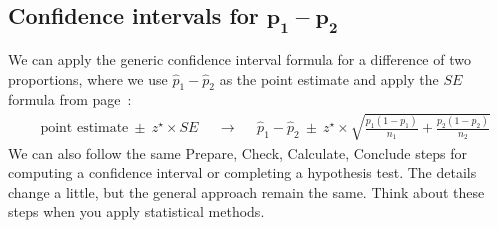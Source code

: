 

\D{\newpage}
\subsection[Confidence intervals for $p_1 - p_2$]
    {Confidence intervals for $\mathbf{p_1 - p_2}$}


\noindent%
We can apply the generic confidence interval formula
for a difference of two proportions,
where we use $\hat{p}_1 - \hat{p}_2$ as the point
estimate and apply the $SE$ formula from
page~\pageref{seForDiffOfProp}:
\begin{align*}
&\text{point estimate} \ \pm\  z^{\star} \times SE
&&\to
&&\hat{p}_1 - \hat{p}_2 \ \pm\ 
    z^{\star} \times
   \sqrt{\frac{p_1(1-p_1)}{n_1} + \frac{p_2(1-p_2)}{n_2}}
\end{align*}
We can also follow the same
Prepare, Check, Calculate, Conclude steps for
computing a confidence interval
or completing a hypothesis test.
The details change a little,
but the general approach remain the same.
Think about these steps when you apply statistical methods.

